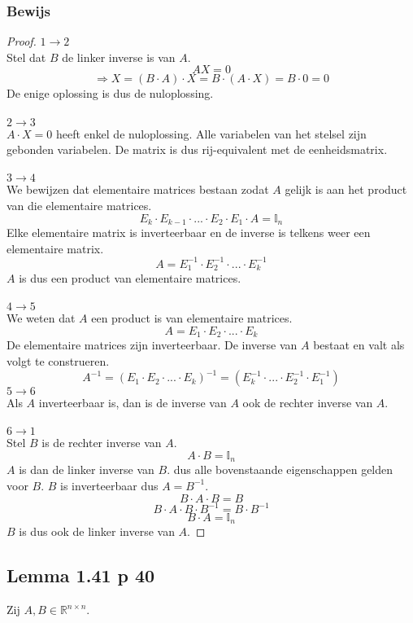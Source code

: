 \documentclass[lineaire_algebra_oplossingen.tex]{subfiles}
\begin{document}
\subsubsection*{Bewijs}
\begin{proof}
\textbf{$1 \rightarrow 2$ }\\
Stel dat $B$ de linker inverse is van $A$.
\[
AX = 0 
\]
\[
\Rightarrow X = (B\cdot A)\cdot X = B \cdot (A\cdot X) = B\cdot 0=0
\]
De enige oplossing is dus de nuloplossing.\\\\
\textbf{$2 \rightarrow 3$ }\\
$A\cdot X = 0$ heeft enkel de nuloplossing. Alle variabelen van het stelsel zijn gebonden variabelen. De matrix is dus rij-equivalent met de eenheidsmatrix.\\\\
\textbf{$3 \rightarrow 4$ }\\
We bewijzen dat elementaire matrices bestaan zodat $A$ gelijk is aan het product van die elementaire matrices.
\[
E_{k}\cdot E_{k-1}\cdot ... \cdot E_{2}\cdot E_{1}\cdot A = \mathbb{I}_{n}
\]
Elke elementaire matrix is inverteerbaar en de inverse is telkens weer een elementaire matrix.
\[
A = E_{1}^{-1}\cdot E_{2}^{-1}\cdot ...\cdot  E_{k}^{-1}
\]
$A$ is dus een product van elementaire matrices.
\\\\
\textbf{$4 \rightarrow 5$ }\\
We weten dat $A$ een product is van elementaire matrices.
\[
A = E_1\cdot E_2 \cdot ... \cdot E_k
\]
De elementaire matrices zijn inverteerbaar. De inverse van $A$ bestaat en valt als volgt te construeren.
\[
A^{-1} = (E_1\cdot E_2 \cdot ... \cdot E_k)^{-1} = (E_k^{-1}\cdot ...\cdot E_2^{-1}\cdot E_1^{-1})
\]
\textbf{$5 \rightarrow 6$ }\\
Als $A$ inverteerbaar is, dan is de inverse van $A$ ook de rechter inverse van $A$.\\\\
\textbf{$6 \rightarrow 1$ }\\
Stel $B$ is de rechter inverse van $A$.
\[
A\cdot B = \mathbb{I}_n
\]
$A$ is dan de linker inverse van $B$. dus alle bovenstaande eigenschappen gelden voor $B$. $B$ is inverteerbaar dus $A = B^{-1}$.
\[
B\cdot A\cdot B = B
\]
\[
B\cdot A \cdot B \cdot B^{-1} = B \cdot B^{-1}
\]
\[
B\cdot A = \mathbb{I}_n
\]
$B$ is dus ook de linker inverse van $A$.
\end{proof}
\subsection{Lemma 1.41 p 40}
Zij $A,B \in \mathbb{R}^{n\times n}$.
\end{document}
